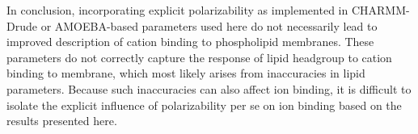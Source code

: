 \documentclass[journal=jctcce,manuscript=article,layout=singlecolumn]{achemso}
\begin{document}



In conclusion, incorporating explicit polarizability as implemented in CHARMM-Drude or AMOEBA-based parameters used here do not necessarily lead to improved description of cation binding to phospholipid membranes. These parameters do not correctly capture the response of lipid headgroup to cation binding to membrane, which most likely arises from inaccuracies in lipid parameters. Because such inaccuracies can also affect ion binding, it is difficult to isolate the explicit influence of polarizability per se on ion binding based on the results presented here. 
\end{document}

